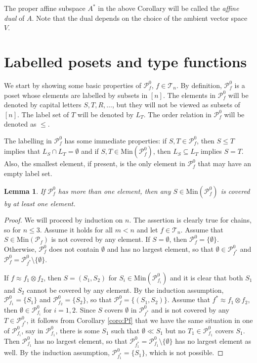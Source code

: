 \documentclass[12pt]{article}
\newtheorem{lemma}{Lemma}
\theoremstyle{definition}
\theoremstyle{remark}
\def\cover{\ll}
\def\Te{\mathcal T}
\def\Pe{\mathcal P}
\begin{document}
The proper affine subspace $A^*$ in the above Corollary will be called the {\em affine
dual}
of $A$. Note that the dual depends on the choice of the ambient vector space $V$.


\section{Labelled posets and type functions} \label{app:pf0}


We start by showing some basic properties of $\Pe_f^0$, $f\in \Te_n$. By definition, $\Pe_f^0$ is a
poset whose elements are labelled by subsets in $[n]$. The elements in $\Pe_f^0$ will be
denoted by capital letters $S,T,R,\dots$, but they will not be viewed as subsets of $[n]$.
The label set of $T$ will be denoted by $L_T$. The
order  relation in $\Pe_f^0$ will be denoted as $\le$.

The labelling in $\Pe_f^0$ has some immediate properties: if $S,T\in \Pe_f^0$, then $S\le
T$ implies that $L_S\cap L_T=\emptyset$ and if $S,T\in \mathrm{Min}(\Pe_f^0)$, then
$L_S\subseteq L_T$ implies $S=T$. Also, the smallest element, if present, is the only element in
$\Pe_f^0$ that may have an empty label set.


\begin{lemma}\label{lemma:pf0_mincover} If $\Pe_f^0$ has more than one element,
then any $S\in \mathrm{Min}(\Pe_f^0)$ is covered by at least one element.

\end{lemma}

\begin{proof} We will proceed by induction on $n$. The assertion is clearly true for
chains, so for $n\le 3$. Assume it holds for all $m<n$ and let $f\in \Te_n$. 
 Assume that  $S\in
\mathrm{Min}(\Pe_f)$ is not covered by any element. If $S=\emptyset$, then
$\Pe_f^0=\{\emptyset\}$. Otherwise, 
$\Pe_f^0$ does not contain $\emptyset$ and has no largest element, so that $\emptyset \in \Pe_{f^*}^0$ and
$\Pe_f^0=\Pe_{f^*}^0\setminus \{\emptyset\}$.

If $f\approx
f_1\otimes f_2$, then $S=(S_1,S_2)$ for $S_i\in \mathrm{Min}(\Pe_{f_i}^0)$ and it is clear
that both $S_1$ and $S_2$ cannot be covered by any element. By the induction assumption,
$\Pe_{f_1}^0=\{S_1\}$ and $\Pe_{f_2}^0=\{S_2\}$, so that $\Pe_f^0=\{(S_1,S_2)\}$.
Assume that $f^*\approx f_1\otimes f_2$, then $\emptyset\in
\Pe_{f_i}^0$ for  $i=1,2$. Since
$S$ covers $\emptyset$  in $\Pe_{f^*}^0$ and is not covered by any $T\in \Pe_{f^*}^0$, it
follows from Corollary \ref{coro:Pf} that we have the same situation in one of
$\Pe^0_{f_i}$, say in $\Pe_{f_1}^0$, there is some $S_1$ such that $\emptyset\cover
S_1$ but no $T_1\in \Pe_{f_1}^0$ covers $S_1$. Then $\Pe_{f_1}^0$ has no largest element, so that $\Pe_{f_1^*}^0=\Pe_{f_1}^0\setminus
\{\emptyset\}$ has no largest element as well.  By the 
induction assumption, $\Pe_{f^*_1}^0=\{S_1\}$, which is not possible.

\end{proof}
\end{document}
